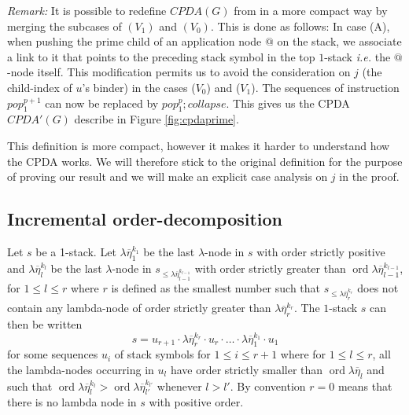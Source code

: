 \documentclass{article}
\newcommand{\ord}{\mathop{\mathrm{ord}}}
\newcommand{\prefixof}{\leqslant}
\theoremstyle{remark}
\theoremstyle{definition}
\begin{document}
{\it Remark:} It is possible to redefine $CPDA(G)$ from
\cite{hague-sto07} in a more compact way by merging the subcases of
$(V_1)$ and $(V_0)$. This is done as follows: In case (A), when
pushing the prime child of an application node $@$ on the stack, we
associate a link to it that points to the preceding stack symbol in
the top $1$-stack {\it i.e.} the $@$-node itself.
 This modification permits us to avoid the consideration on $j$ (the child-index of $u$'s binder) in the
 cases ($V_0$) and ($V_1$). The sequences of instruction $pop_1^{p+1}$ can now be replaced by
 $pop_1^p ; collapse$. This gives us the CPDA $CPDA'(G)$ describe in
Figure \ref{fig:cpdaprime}.
\begin{figure}[htbp]
\begin{center}
\end{center}
\end{figure}
This definition is more compact, however it makes it harder to
understand how the CPDA works. We will therefore stick to the
original definition for the purpose of proving our result and we
will make an explicit case analysis on $j$ in the proof.


\subsection{Incremental order-decomposition}

Let $s$ be a 1-stack. Let $\lambda \overline{\eta}_1^{k_1}$ be the
last $\lambda$-node in $s$ with order strictly positive and $\lambda
\overline{\eta}_l^{k_l}$ be the last $\lambda$-node in $s_{\prefixof
\lambda \overline{\eta}_{l-1}^{k_{l-1}}}$ with order strictly
greater than $\ord{\lambda \overline{\eta}_{l-1}^{k_{l-1}}}$, for $1
\leq l \leq r$ where $r$ is defined as the smallest number such that
$s_{\prefixof \lambda \overline{\eta}_{r}^{k_{r}}}$ does not contain
any lambda-node of order strictly greater than $\lambda
\overline{\eta}_{r}^{k_{r}}$. The $1$-stack $s$ can then be written
$$ s = u_{r+1} \cdot \lambda \overline{\eta}_r^{k_r} \cdot u_r \cdot
\ldots \cdot \lambda \overline{\eta}_1^{k_1} \cdot  u_1 $$ for some
sequences $u_i$ of stack symbols for $1 \leq i \leq r+1$ where for
$1\leq l \leq r$, all the lambda-nodes occurring in $u_l$ have order
strictly smaller than $\ord{\lambda \overline{\eta}_l}$ and such
that $\ord{\lambda \overline{\eta}_l^{k_l}}
> \ord{\lambda \overline{\eta}_{l'}^{k_{l'}}}$ whenever $l>l'$.
By convention $r=0$ means that there is no lambda node in $s$ with
positive order.
\end{document}
